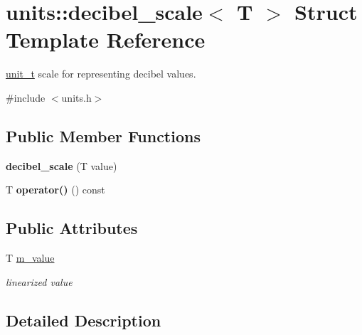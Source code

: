 \hypertarget{structunits_1_1decibel__scale}{}\section{units\+:\+:decibel\+\_\+scale$<$ T $>$ Struct Template Reference}
\label{structunits_1_1decibel__scale}


\hyperlink{classunits_1_1unit__t}{unit\+\_\+t} scale for representing decibel values.  




{\ttfamily \#include $<$units.\+h$>$}

\subsection*{Public Member Functions}
\begin{DoxyCompactItemize}
\item 
\hypertarget{structunits_1_1decibel__scale_a4a7ed3c7b2fce24663ea575d96105991}{}{\bfseries decibel\+\_\+scale} (T value)\label{structunits_1_1decibel__scale_a4a7ed3c7b2fce24663ea575d96105991}

\item 
\hypertarget{structunits_1_1decibel__scale_a533c8316c4ae1839f00822bc1e7bf715}{}T {\bfseries operator()} () const \label{structunits_1_1decibel__scale_a533c8316c4ae1839f00822bc1e7bf715}

\end{DoxyCompactItemize}
\subsection*{Public Attributes}
\begin{DoxyCompactItemize}
\item 
\hypertarget{structunits_1_1decibel__scale_a9716193561ed712aeafdd6b86e376936}{}T \hyperlink{structunits_1_1decibel__scale_a9716193561ed712aeafdd6b86e376936}{m\+\_\+value}\label{structunits_1_1decibel__scale_a9716193561ed712aeafdd6b86e376936}

\begin{DoxyCompactList}\small\item\em linearized value \end{DoxyCompactList}\end{DoxyCompactItemize}


\subsection{Detailed Description}
